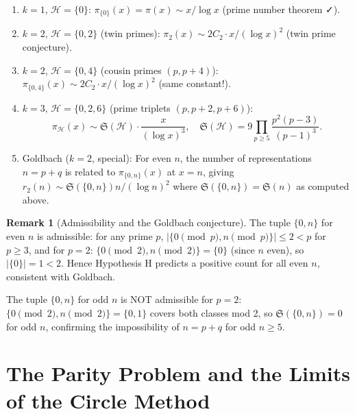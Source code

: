 \documentclass[12pt,a4paper]{amsart}
\theoremstyle{definition}
\newtheorem{remark}[theorem]{Remark}
\begin{document}
\begin{example}
  \begin{enumerate}
    \item $k = 1$, $\mathcal{H} = \{0\}$:
      $\pi_{\{0\}}(x) = \pi(x) \sim x/\log x$ (prime number theorem ✓).
    \item $k = 2$, $\mathcal{H} = \{0, 2\}$ (twin primes):
      $\pi_2(x) \sim 2C_2 \cdot x/(\log x)^2$ (twin prime conjecture).
    \item $k = 2$, $\mathcal{H} = \{0, 4\}$ (cousin primes $(p, p+4)$):
      $\pi_{\{0,4\}}(x) \sim 2C_2 \cdot x/(\log x)^2$ (same constant!).
    \item $k = 3$, $\mathcal{H} = \{0, 2, 6\}$ (prime triplets $(p,p+2,p+6)$):
      \[
        \pi_{\mathcal{H}}(x) \sim \mathfrak{S}(\mathcal{H}) \cdot \frac{x}{(\log x)^3},
        \quad \mathfrak{S}(\mathcal{H}) = 9 \prod_{p \geq 5} \frac{p^2(p-3)}{(p-1)^3}.
      \]
    \item Goldbach ($k=2$, special): For even $n$, the number of
      representations $n = p + q$ is related to $\pi_{\{0, n\}}(x)$
      at $x = n$, giving $r_2(n) \sim \mathfrak{S}(\{0,n\}) n/(\log n)^2$
      where $\mathfrak{S}(\{0,n\}) = \mathfrak{S}(n)$ as computed above.
  \end{enumerate}
\end{example}

\begin{remark}[Admissibility and the Goldbach conjecture]
  The tuple $\{0, n\}$ for even $n$ is admissible: for any prime $p$,
  $|\{0 \pmod p, n \pmod p\}| \leq 2 < p$ for $p \geq 3$, and for
  $p = 2$: $\{0 \pmod 2, n \pmod 2\} = \{0\}$ (since $n$ even), so
  $|\{0\}| = 1 < 2$.  Hence Hypothesis H predicts a positive count
  for all even $n$, consistent with Goldbach.

  The tuple $\{0, n\}$ for odd $n$ is NOT admissible for $p = 2$:
  $\{0 \pmod 2, n \pmod 2\} = \{0, 1\}$ covers both classes mod 2,
  so $\mathfrak{S}(\{0,n\}) = 0$ for odd $n$, confirming the
  impossibility of $n = p + q$ for odd $n \geq 5$.
\end{remark}

\section{The Parity Problem and the Limits of the Circle Method}
\label{sec:parity}
\end{document}
